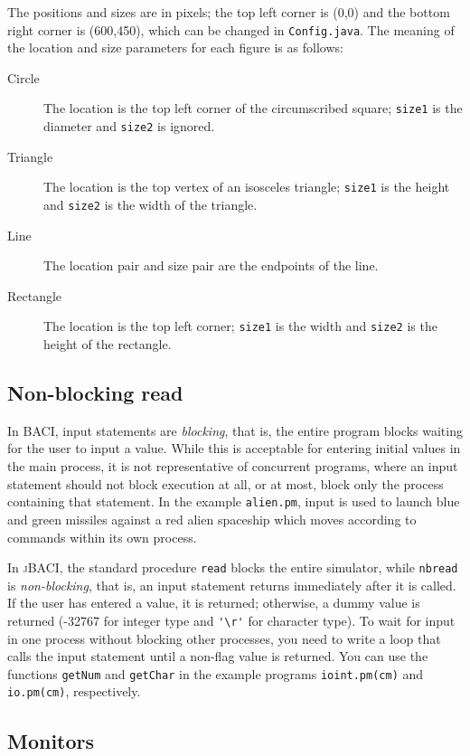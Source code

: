 \documentclass[11pt]{article}
\newcommand{\jb}{\textsc{\sffamily jBACI}}
\newcommand{\baci}{\textsc{\sffamily BACI}}
\newcommand{\p}[1]{\texttt{#1}}
\begin{document}
The positions and sizes are in pixels; the top left corner is (0,0)
and the bottom right corner is (600,450), which can be changed in
\p{Config.java}.
The meaning of the location and size parameters for each figure
is as follows:
\begin{description}
\item[Circle] The location is the top left corner of the circumscribed
square; \p{size1} is the diameter and \p{size2} is ignored.
\item[Triangle] The location is the top vertex of an isosceles triangle;
\p{size1} is the height and \p{size2} is the width of the triangle.
\item[Line] The location pair and size pair are the endpoints of the line.
\item[Rectangle] The location is the top left corner;
\p{size1} is the width and \p{size2} is the height of the rectangle.
\end{description}

\subsection{Non-blocking read}

In \baci{}, input statements are \emph{blocking},
that is, the entire program blocks waiting for the user to input a value.
While this is acceptable for entering initial values in the main process,
it is not representative of concurrent programs,
where an input statement should not block execution at all,
or at most, block only the process containing that statement.
In the example \p{alien.pm},
input is used to launch blue and green missiles
against a red alien spaceship
which moves according to commands within its own process.

In \jb{}, the standard procedure \p{read} blocks the entire simulator,
while \p{nbread} is \emph{non-blocking},
that is, an input statement returns immediately after it is called.
If the user has entered a value, it is returned;
otherwise, a dummy value is returned (-32767 for integer type
and \verb+'\r'+ for character type).
To wait for input in one process without blocking other processes,
you need to write a loop that calls the input statement
until a non-flag value is returned.
You can use the functions \p{getNum} and \p{getChar}
in the example programs \p{ioint.pm(cm)} and \p{io.pm(cm)},
respectively.

\subsection{Monitors}
\end{document}
